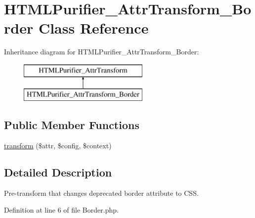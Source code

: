 \hypertarget{classHTMLPurifier__AttrTransform__Border}{\section{H\+T\+M\+L\+Purifier\+\_\+\+Attr\+Transform\+\_\+\+Border Class Reference}
\label{classHTMLPurifier__AttrTransform__Border}
}
Inheritance diagram for H\+T\+M\+L\+Purifier\+\_\+\+Attr\+Transform\+\_\+\+Border\+:\begin{figure}[H]
\begin{center}
\leavevmode
\includegraphics[height=2.000000cm]{classHTMLPurifier__AttrTransform__Border}
\end{center}
\end{figure}
\subsection*{Public Member Functions}
\begin{DoxyCompactItemize}
\item 
\hyperlink{classHTMLPurifier__AttrTransform__Border_affb46b38b765c457e6fddcbf55b3ec77}{transform} (\$attr, \$config, \$context)
\end{DoxyCompactItemize}


\subsection{Detailed Description}
Pre-\/transform that changes deprecated border attribute to C\+S\+S. 

Definition at line 6 of file Border.\+php.



